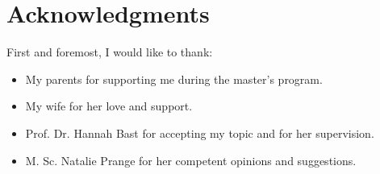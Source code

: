 \chapter*{Acknowledgments}
First and foremost, I would like to thank:
\begin{itemize}
  \item My parents for supporting me during the master's program.
    \item My wife for her love and support.
  \item Prof. Dr. Hannah Bast for accepting my topic and for her supervision.
    \item M. Sc. Natalie Prange​ for her competent opinions and suggestions.
\end{itemize}